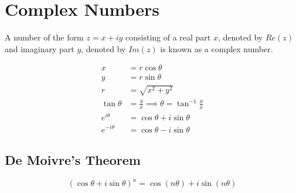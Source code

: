 \section{Complex Numbers}
A number of the form \(z = x + iy \) consisting of a real part $x$, denoted by \( Re(z) \) and imaginary part $y$, denoted by \( Im(z) \) is known as a complex number.

\begin{align}
x &= r\cos\theta \\
y &= r\sin\theta \\
r &= \sqrt{{x^2}+{y^2}} \\
\tan\theta &= \frac{y}{x} \implies \theta = \tan^{-1}{\frac{y}{x}} \\
e^{i\theta} &= \cos\theta + i\sin\theta \\
e^{-i\theta} &= \cos\theta - i\sin\theta
\end{align}

\subsection{\textbf{De Moivre's Theorem}}
\begin{equation}
\label{demovire}
({\cos\theta} + {i\sin\theta})^{n} = \cos(n\theta) + i\sin(n\theta)
\end{equation}

